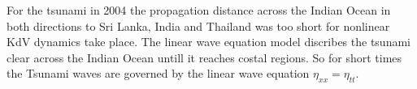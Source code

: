 For the tsunami in 2004 the propagation distance across the Indian Ocean in
both directions to Sri Lanka, India and Thailand was too short for nonlinear
KdV dynamics take place. The linear wave equation model discribes the tsunami
clear across the Indian Ocean untill it reaches costal regions. So for short
times the Tsunami waves are governed by the linear wave equation $\eta_{x x }
= \eta_{t t}$.








